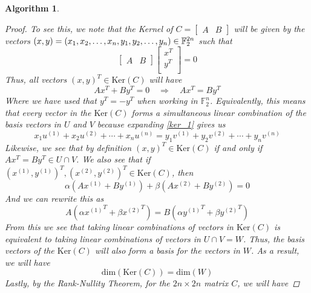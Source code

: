 \message{ !name(report_1.tex)}\documentclass[11pt]{article}
\newtheorem{algorithm}{Algorithm}
\theoremstyle{definition}
\theoremstyle{plain}
\begin{document}
\begin{algorithm}
\begin{proof}
  To see this, we note that the Kernel of $C = \begin{bmatrix} A & B \end{bmatrix}$ will be given by the vectors $(x, y) = \\(x_1, x_2, \ldots, x_n, y_1, y_2, \ldots, y_n) \in \mathbb{F}_2^{2n}$ such that
\begin{equation}
  \begin{bmatrix}
    A & B 
  \end{bmatrix}
  \begin{bmatrix}
    x^T \\ 
    y^T \\ 
  \end{bmatrix}
  = 0 
\end{equation}
Thus, all vectors ${(x, y)}^T \in \text{Ker}(C)$ will have 
\begin{equation}\label{ker_1}
  Ax^T + By^T = 0 \quad \Rightarrow \quad Ax^T = By^T 
\end{equation}
Where we have used that $y^T = -y^T$ when working in $\mathbb{F}_2^n$. Equivalently, this means that every vector in the $\text{Ker}(C)$ forms a simultaneous linear combination of the basis vectors in $U$ and $V$ because expanding {\ref{ker_1}} gives us
\begin{equation}
  x_1 u^{(1)} + x_2 u^{(2)} + \cdots + x_n u^{(n)} =
  y_1 v^{(1)} + y_2 v^{(2)} + \cdots + y_n v^{(n)} 
\end{equation}
Likewise, we see that by definition ${(x, y)}^T \in \text{Ker}(C)$ if and only if $Ax^T = By^T \in U \cap V$. We also see that if ${(x^{(1)}, y^{(1)})}^T, {(x^{(2)}, y^{(2)})}^T \in \text{Ker}(C)$, then 
\begin{equation}
\alpha (A x^{(1)} + B y^{(1)}) + \beta (A x^{(2)} + B y^{(2)}) = 0
\end{equation}
And we can rewrite this as
\begin{equation}
A (\alpha {x^{(1)}}^T + \beta {x^{(2)}}^T) = B (\alpha {y^{(1)}}^T + \beta {y^{(2)}}^T) 
\end{equation}
From this we see that taking linear combinations of vectors in $\text{Ker}(C)$ is equivalent to taking linear combinations of vectors in $U \cap V = W$. Thus, the basis vectors of the $\text{Ker}(C)$ will also form a basis for the vectors in $W$. As a result, we will have
\begin{equation}\label{algo_proof_1}
  \text{dim}(\text{Ker}(C)) = \text{dim}(W)
\end{equation}
Lastly, by the Rank-Nullity Theorem, for the $2n \times 2n$ matrix $C$, we will have

\end{proof}
\end{algorithm}
\end{document}
